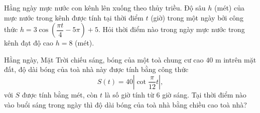\begin{ex}%
	Hằng ngày mực nước con kênh lên xuống theo thủy triều. Độ sâu $h$ (mét) của mực nước trong kênh được tính tại thời điểm $t$ (giờ) trong một ngày bởi công thức $h=3 \cos \left(\dfrac{\pi t}{4}-5 \pi\right)+5$. Hỏi thời điểm  nào trong ngày mực nước trong kênh đạt độ cao $h=8$ (mét).
\end{ex}

\begin{ex}%
	Hằng ngày, Mặt Trời chiếu sáng, bóng của một toà chung cư cao $40$ m intrên  mặt đất, độ dài bóng của toà nhà này được tính bằng công thức
	 $$S(t)=40\left|\cot\dfrac{\pi}{12}t\right|,$$
	với $S$ được tính bằng mét, còn $t$ là số giờ tính từ $6$ giờ sáng. Tại thời điểm nào vào buổi sáng trong ngày thì độ dài bóng của toà nhà bằng  chiều cao toà nhà?
\end{ex}

